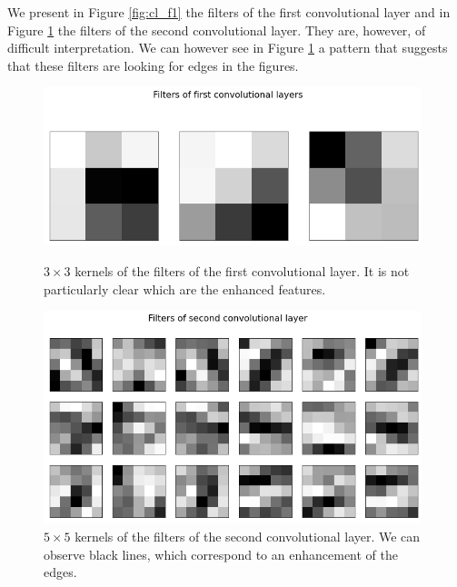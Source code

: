 We present in Figure \ref{fig:cl_f1} the filters of the first convolutional layer and in 
Figure \ref{fig:cl_f2} the filters of the second convolutional layer. They are, however, of difficult interpretation. We can 
however see in Figure \ref{fig:cl_f2} a pattern that suggests that these filters are looking for edges in the figures.
\begin{figure}[h]
    \centering
    \begin{minipage}[t]{0.48\textwidth}
        \centering
        \includegraphics[width=0.98\textwidth]{Images/clas_filt1.png}
        \caption{$3\times3$ kernels of the filters of the first convolutional layer. It is not particularly clear which are
        the enhanced features. }
        \label{fig:cl_f1}
    \end{minipage}\hfill
    \begin{minipage}[t]{0.48\textwidth}
        \centering
        \includegraphics[width=0.98\textwidth]{Images/clas_filt2.png}
        \caption{$5\times5$ kernels of the filters of the second convolutional layer. We can observe black lines, which correspond
        to an enhancement of the edges.}
        \label{fig:cl_f2}
    \end{minipage}
\end{figure}

